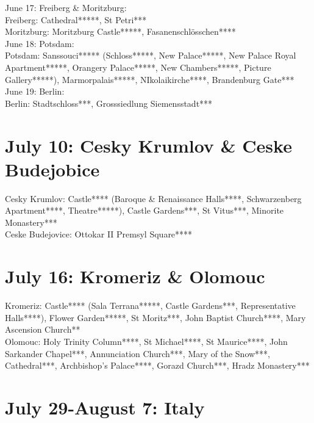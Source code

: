 June 17: Freiberg \& Moritzburg:\\

Freiberg: Cathedral*****, St Petri***\\
Moritzburg: Moritzburg Castle*****, Fasanenschl\"osschen****\\

June 18: Potsdam:\\

Potsdam: Sanssouci***** (Schloss*****, New Palace*****, New Palace Royal Apartment*****, Orangery Palace*****, New Chambers*****, Picture Gallery*****), Marmorpalais*****, NIkolaikirche****, Brandenburg Gate***\\

June 19: Berlin:\\

Berlin: Stadtschloss***, Grosssiedlung Siemensstadt***\\

\section{July 10: Cesky Krumlov \& Ceske Budejobice}
\label{2022:CeskyKrumlov}

Cesky Krumlov: Castle**** (Baroque \& Renaissance Halls****, Schwarzenberg Apartment****, Theatre*****), Castle Gardens***, St Vitus***, Minorite Monastery***\\
Ceske Budejovice: Ottokar II Premsyl Square****\\

\section{July 16:  Kromeriz \& Olomouc}
\label{2022:KromerizOlomouc}

Kromeriz: Castle**** (Sala Terrana*****, Castle Gardens***, Representative Halls****), Flower Garden*****, St Moritz***, John Baptist Church****,  Mary Ascension Church**\\
Olomouc: Holy Trinity Column****, St Michael****, St Maurice****, John Sarkander Chapel***, Annunciation Church***, Mary of the Snow***, Cathedral***, Archbishop's Palace****, Gorazd Church***, Hradz Monastery***\\


\section{July 29-August 7:  Italy}
\label{2022:Italy}

